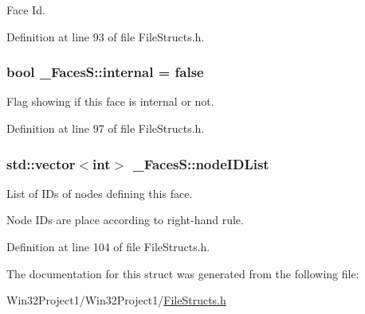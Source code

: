 Face Id. 



Definition at line 93 of file File\+Structs.\+h.

\subsubsection[{\texorpdfstring{internal}{internal}}]{\setlength{\rightskip}{0pt plus 5cm}bool \+\_\+\+Faces\+S\+::internal = false}\hypertarget{struct___faces_s_a5ce239e336aea528dad6008a6f2909f0}{}\label{struct___faces_s_a5ce239e336aea528dad6008a6f2909f0}


Flag showing if this face is internal or not. 



Definition at line 97 of file File\+Structs.\+h.

\subsubsection[{\texorpdfstring{node\+I\+D\+List}{nodeIDList}}]{\setlength{\rightskip}{0pt plus 5cm}std\+::vector$<$int$>$ \+\_\+\+Faces\+S\+::node\+I\+D\+List}\hypertarget{struct___faces_s_a1af35bd658b7be0f98e09deb5f8b3ead}{}\label{struct___faces_s_a1af35bd658b7be0f98e09deb5f8b3ead}


List of I\+Ds of nodes defining this face. 

Node I\+Ds are place according to right-\/hand rule. 

Definition at line 104 of file File\+Structs.\+h.



The documentation for this struct was generated from the following file\+:\begin{DoxyCompactItemize}
\item 
Win32\+Project1/\+Win32\+Project1/\hyperlink{_file_structs_8h}{File\+Structs.\+h}\end{DoxyCompactItemize}
